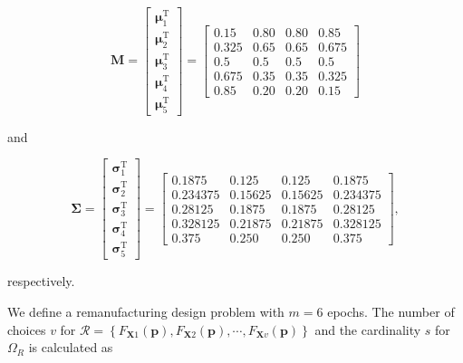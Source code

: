 \begin{equation*}
	\mathbf{M} = \begin{bmatrix}
		\boldsymbol{\mu}_1 ^ {\mathrm{T}} \\ 
		\boldsymbol{\mu}_2 ^ {\mathrm{T}} \\
		\boldsymbol{\mu}_3 ^ {\mathrm{T}} \\
		\boldsymbol{\mu}_4 ^ {\mathrm{T}} \\
		\boldsymbol{\mu}_5 ^ {\mathrm{T}} 
	\end{bmatrix} = \begin{bmatrix}
		0.15 & 0.80 & 0.80 & 0.85 \\ 
		0.325 & 0.65 & 0.65 & 0.675 \\
		0.5 & 0.5 & 0.5 & 0.5 \\
		0.675 & 0.35 & 0.35 & 0.325 \\
		0.85 & 0.20 & 0.20 & 0.15 
	\end{bmatrix}
\end{equation*}

and

\begin{equation*}
	\boldsymbol{\Sigma} = \begin{bmatrix}
		\boldsymbol{\sigma}_1 ^ {\mathrm{T}} \\ 
		\boldsymbol{\sigma}_2 ^ {\mathrm{T}} \\
		\boldsymbol{\sigma}_3 ^ {\mathrm{T}} \\
		\boldsymbol{\sigma}_4 ^ {\mathrm{T}} \\
		\boldsymbol{\sigma}_5 ^ {\mathrm{T}} 
	\end{bmatrix} = \begin{bmatrix}
		0.1875 & 0.125 & 0.125 & 0.1875 \\ 
		0.234375 & 0.15625 & 0.15625 & 0.234375 \\
		0.28125 & 0.1875 & 0.1875 & 0.28125 \\
		0.328125 & 0.21875 & 0.21875 & 0.328125 \\
		0.375 & 0.250 & 0.250 & 0.375
	\end{bmatrix},
\end{equation*}

respectively.

We define a remanufacturing design problem with $m = 6$ epochs. The number of choices $v$ for $\mathcal{R} = \left\{F_{\mathbf{X}1}(\mathbf{p}),F_{\mathbf{X}2}(\mathbf{p}),\cdots,F_{\mathbf{X}v}(\mathbf{p})\right\}$ and the cardinality $s$ for $\Omega_R$ is calculated as

